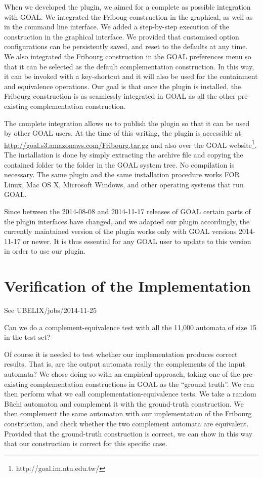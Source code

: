 When we developed the plugin, we aimed for a complete as possible integration with GOAL. We integrated the Friboug construction in the graphical, as well as in the command line interface. We added a step-by-step execution of the construction in the graphical interface. We provided that customised option configurations can be persistently saved, and reset to the defaults at any time. We also integrated the Fribourg construction in the GOAL preferences menu so that it can be selected as the default complementation construction. In this way, it can be invoked with a key-shortcut and it will also be used for the containment and equivalence operations. Our goal is that once the plugin is installed, the Fribourg construction is as seamlessly integrated in GOAL as all the other pre-existing complementation construction.

The complete integration allows us to publish the plugin so that it can be used by other GOAL users. At the time of this writing, the plugin is accessible at \url{http://goal.s3.amazonaws.com/Fribourg.tar.gz} and also over the GOAL website\footnote{http://goal.im.ntu.edu.tw/}. The installation is done by simply extracting the archive file and copying the contained folder to the  folder in the GOAL system tree. No compilation is necessary. The same plugin and the same installation procedure works FOR Linux, Mac OS X, Microsoft Windows, and other operating systems that run GOAL.

Since between the 2014-08-08 and 2014-11-17 releases of GOAL certain parts of the plugin interfaces have changed, and we adapted our plugin accordingly, the currently maintained version of the plugin works only with GOAL versions 2014-11-17 or newer. It is thus essential for any GOAL user to update to this version in order to use our plugin.

\section{Verification of the Implementation}

See UBELIX/jobs/2014-11-25

Can we do a complement-equivalence test with all the 11,000 automata of size 15 in the test set?

Of course it is needed to test whether our implementation produces correct results. That is, are the output automata really the complements of the input automata? We chose doing so with an empirical approach, taking one of the pre-existing complementation constructions in GOAL as the ``ground truth''. We can then perform what we call complementation-equivalence tests. We take a random Büchi automaton and complement it with the ground-truth construction. We then complement the same automaton with our implementation of the Fribourg construction, and check whether the two complement automata are equivalent. Provided that the ground-truth construction is correct, we can show in this way that our construction is correct for this specific case.

